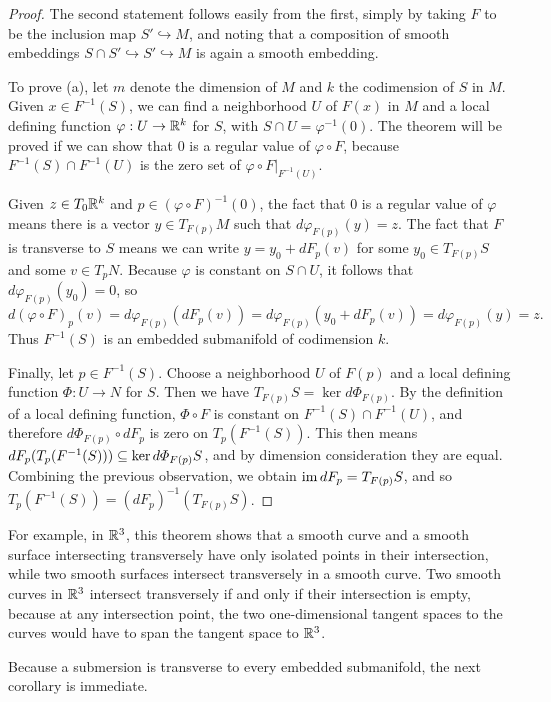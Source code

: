 \begin{proof}
The second statement follows easily from the first, simply by taking $F$ to be the inclusion map $S'\hookrightarrow M$, and noting that a composition of smooth embeddings $S\cap S'\hookrightarrow S'\hookrightarrow M$ is again a smooth embedding.\par
To prove (a), let $m$ denote the dimension of $M$ and $k$ the codimension of $S$ in $M$. Given $x\in F^{-1}(S)$, we can find a neighborhood $U$ of $F(x)$ in $M$ and a local defining function $\varphi:U\to\mathbb{R}^k$ for $S$, with $S\cap U=\varphi^{-1}(0)$. The theorem will be proved if we can show that $0$ is a regular value of $\varphi\circ F$, because $F^{-1}(S)\cap F^{-1}(U)$ is the zero set of $\varphi\circ F|_{F^{-1}(U)}$.\par
Given $z\in T_0\mathbb{R}^k$ and $p\in(\varphi\circ F)^{-1}(0)$, the fact that $0$ is a regular value of $\varphi$ means there is a vector $y\in T_{F(p)}M$ such that $d\varphi_{F(p)}(y)=z$. The fact that $F$ is transverse to $S$ means we can write $y=y_0+dF_p(v)$ for some $y_0\in T_{F(p)}S$ and some $v\in T_pN$. Because $\varphi$ is constant on $S\cap U$, it follows that $d\varphi_{F(p)}(y_0)=0$, so
\[d(\varphi\circ F)_p(v)=d\varphi_{F(p)}(dF_p(v))=d\varphi_{F(p)}(y_0+dF_p(v))=d\varphi_{F(p)}(y)=z.\]
Thus $F^{-1}(S)$ is an embedded submanifold of codimension $k$.\par
Finally, let $p\in F^{-1}(S)$. Choose a neighborhood $U$ of $F(p)$ and a local defining function $\varPhi:U\to N$ for $S$. Then we have $T_{F(p)}S=\ker d\varPhi_{F(p)}$. By the definition of a local defining function, $\varPhi\circ F$ is constant on $F^{-1}(S)\cap F^{-1}(U)$, and therefore $d\varPhi_{F(p)}\circ dF_p$ is zero on $T_p(F^{-1}(S))$. This then means $ dF_p(T_p(F^{-1}(S)))\subseteq\ker d\varPhi_{F(p)}S$, and by dimension consideration they are equal. Combining the previous observation, we obtain $\mathrm{im}\, dF_p=T_{F(p)}S$, and so $T_p(F^{-1}(S))=(dF_p)^{-1}(T_{F(p)}S)$.
\end{proof}
For example, in $\mathbb{R}^3$, this theorem shows that a smooth curve and a smooth surface intersecting transversely have only isolated points in their intersection, while two smooth surfaces intersect transversely in a smooth curve. Two smooth curves in $\mathbb{R}^3$ intersect transversely if and only if their intersection is empty, because at any intersection point, the two one-dimensional tangent spaces to the curves would have to span the tangent space to $\mathbb{R}^3$.\par 
Because a submersion is transverse to every embedded submanifold, the next corollary is immediate.
